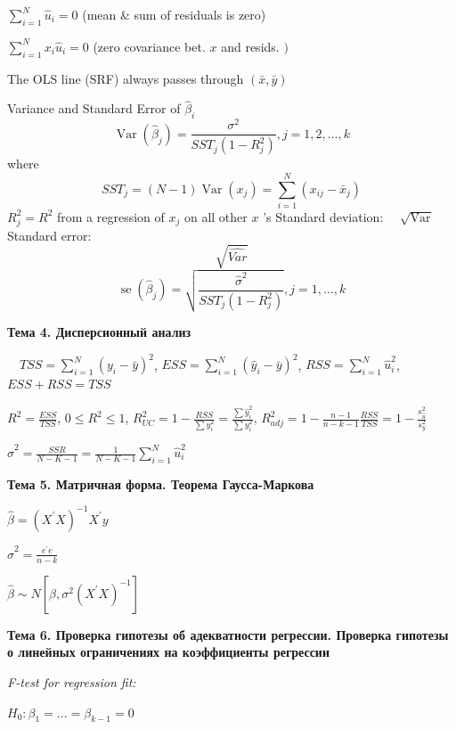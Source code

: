 \documentclass[a4paper,8pt]{article} %
\begin{document}
$\sum_{i=1}^{N} \hat{u}_{i}=0$ (mean \& sum of residuals is zero) 

$\sum_{i=1}^{N} x_{i} \hat{u}_{i}=0$ (zero covariance bet. $x$ and resids. $)$ 

The OLS line (SRF) always passes through $(\bar{x}, \bar{y})$ 

Variance and Standard Error of $\hat{\beta}_{i}$
$$
\operatorname{Var}\left(\hat{\beta}_{j}\right)=\frac{\sigma^{2}}{S S T_{j}\left(1-R_{j}^{2}\right)}, j=1,2, \ldots, k
$$
where
$$
S S T_{j}=(N-1) \operatorname{Var}\left(x_{j}\right)=\sum_{i=1}^{N}\left(x_{i j}-\bar{x}_{j}\right)
$$
$R_{j}^{2}=R^{2}$ from a regression of $x_{j}$ on all other $x$ 's Standard deviation: $\quad \sqrt{\operatorname{Var}}$
Standard error:
$$
\sqrt{\widehat{V a r}}
$$
$$
\operatorname{se}\left(\hat{\beta}_{j}\right)=\sqrt{\frac{\hat{\sigma}^{2}}{S S T_{j}\left(1-R_{j}^{2}\right)}}, j=1, \ldots, k
$$



\textbf{Тема 4. Дисперсионный
анализ
}


$\quad TS S=\sum_{i=1}^{N}\left(y_{i}-\bar{y}\right)^{2}$, $ES S =\sum_{i=1}^{N}\left(\hat{y}_{i}-\bar{y}\right)^{2}$, 
$RS S =\sum_{i=1}^{N} \hat{u}_{i}^{2}$,  $ES S +RS S =TS S $

$R^{2}=\frac{ESS}{TS S} $, 
$0 \leq R^{2} \leq 1$, 
$R^2_{UC} = 1 - \frac{RSS}{\sum y_i^2}  = \frac{\sum\hat{y}_i^2}{\sum y_i^2} $, $R^2_{adj} = 1 - \frac{n-1}{n-k-1} \frac{RSS}{TSS} = 1 - \frac{s^2_{\hat{u}}}{s^2_{y}}$ 



$\hat{\sigma}^{2} =\frac{S S R}{N-K-1} =\frac{1}{N-K-1} \sum_{i=1}^{N} \hat{u}_{i}^{2}$






\textbf{Тема 5. Матричная форма. Теорема Гаусса-Маркова}

$\hat{\beta}=\left(X^{\prime} X\right)^{-1} X^{\prime} y$



$\hat{\sigma}^{2}=\frac{e^{\prime} e}{n-k}$

$\hat{\beta} \sim N\left[\beta, \sigma^{2}\left(X^{\prime} X\right)^{-1}\right]$

\textbf{Тема 6. Проверка гипотезы об адекватности регрессии.
Проверка гипотезы о линейных ограничениях на коэффициенты
регрессии}


\textit{F-test for regression fit: }

$H_0: \beta_1 = \dots = \beta_{k-1} = 0  $
\end{document}
